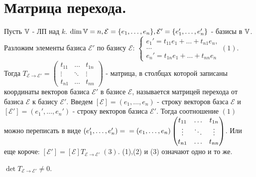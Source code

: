\documentclass[../main.tex]{subfiles}
\begin{document}
\newpage
{}
\section{Матрица перехода.}
Пусть $\mathbb{V}$ - ЛП над $k$. $\dim \mathbb{V} = n, \mathcal{E}=\{e_{1},\dots,e_{n}\}, \mathcal{E'}=\{e_{1}',\dots,e_{n}'\}$ - базисы в $\mathbb{V}$. 
\\Разложим элементы базиса $\mathcal{E'}$ по базису $\mathcal{E}$: $\begin{cases}e_{1}'=t_{11}e_{1}+\dots+t_{n1}e_{n},\\\dots\\e_{n}'=t_{1n}e_{1}+\dots+t_{nn}e_{n} \end{cases}(1)$.  Тогда $T_{\mathcal{E}\to\mathcal{E'} }= \begin{pmatrix}
    t_{11} & \dots & t_{1n}\\
    \vdots & \ddots & \vdots\\
    t_{n1} & \dots & t_{nn}
\end{pmatrix}$ - матрица, в столбцах которой записаны координаты векторов базиса $\mathcal{E'}$ в базисе $\mathcal{E}$, называется матрицей перехода от базиса $\mathcal{E}$ к базису $\mathcal{E'}$. Введем $[\mathcal{E}]=(e_{1},\dots,e_{n})$ - строку векторов базса $\mathcal{E}$ и $[\mathcal{E'}]=(e_{1}',\dots,e_{n}')$ - строку векторов базиса $\mathcal{E'}$. Тогда соотношение $(1)$ можно переписать в виде $(e_{1}',\dots,e_{n}')=\\= (e_{1},\dots,e_{n})\begin{pmatrix}
    t_{11} & \dots & t_{1n}\\
    \vdots & \ddots & \vdots\\
    t_{n1} & \dots & t_{nn}
\end{pmatrix}$. Или еще короче: $[\mathcal{E'}]=[\mathcal{E}]T_{\mathcal{E}\to\mathcal{E'}}\;(3)$. (1),(2) и (3) означают одно и то же.

\begin{theorem}
    $\det T_{\mathcal{E}\to\mathcal{E'}}\neq 0$.
\end{theorem}
\end{document}
